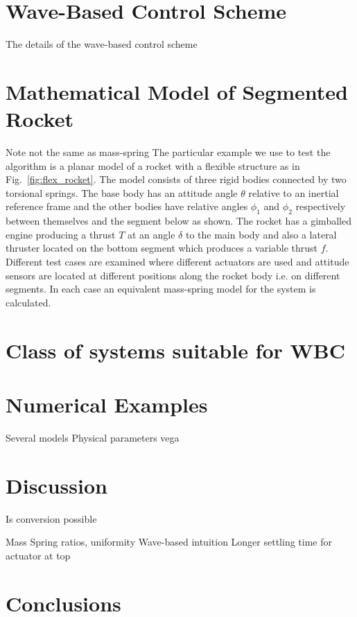 \documentclass{mbd_fullpaper}
\begin{document}
\section{Wave-Based Control Scheme}
The details of the wave-based control scheme

\section{Mathematical Model of Segmented Rocket}

Note not the same as mass-spring
The particular example we use to test the algorithm is a planar model of a rocket with a flexible structure as in Fig.~\ref{fig:flex_rocket}. The model consists of three rigid bodies connected by two torsional springs. The base body has an attitude angle $\theta$ relative to an inertial reference frame and the other bodies have relative angles $\phi_1$ and $\phi_2$ respectively between themselves and the segment below as shown. The rocket has a gimballed engine producing a thrust $T$ at an angle $\delta$ to the main body and also a lateral thruster located on the bottom segment which produces a variable thrust $f$. Different test cases are examined where different actuators are used and attitude sensors are located at different positions along the rocket body i.e. on different segments. In each case an equivalent mass-spring model for the system is calculated.



\section{Class of systems suitable for WBC}

\section{Numerical Examples}
Several models
Physical parameters vega

\section{Discussion}
Is conversion possible

Mass Spring ratios, uniformity
Wave-based intuition
Longer settling time for actuator at top

\section{Conclusions}
\end{document}
